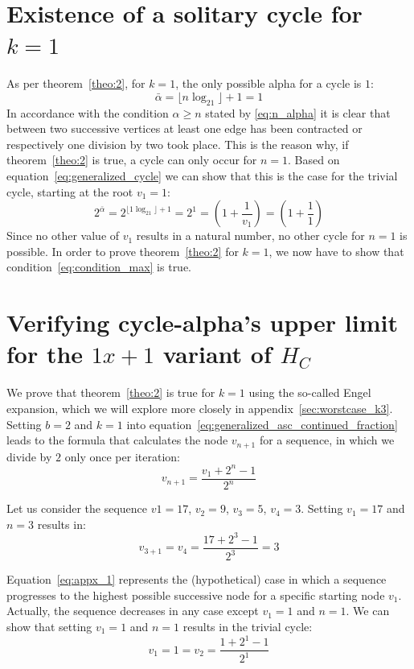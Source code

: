 \section{Existence of a solitary cycle for $k=1$}
As per theorem~\ref{theo:2}, for $k=1$, the only possible alpha for a cycle is $1$:
\[
\bar\alpha=\lfloor n\log_21\rfloor+1=1
\]
In accordance with the condition $\alpha\ge n$ stated by \ref{eq:n_alpha} it is clear that between two successive vertices at least one edge has been contracted or respectively one division by two took place. This is the reason why, if theorem~\ref{theo:2} is true, a cycle can only occur for $n=1$. Based on equation~\ref{eq:generalized_cycle} we can show that this is the case for the trivial cycle, starting at the root $v_1=1$:
\[
2^{\bar\alpha}=2^{\lfloor 1\log_21\rfloor+1}=2^1=\left(1+\frac{1}{v_1}\right)=\left(1+\frac{1}{1}\right)
\]
Since no other value of $v_1$ results in a natural number, no other cycle for $n=1$ is possible. In order to prove theorem~\ref{theo:2} for $k=1$, we now have to show that condition~\ref{eq:condition_max} is true.

\section{Verifying cycle-alpha's upper limit for the $1x+1$ variant of $H_C$}
\label{sec:alphas_upper_limit_k_1}
We prove that theorem~\ref{theo:2} is true for $k=1$ using the so-called Engel expansion, which we will explore more closely in appendix~\ref{sec:worstcase_k3}. Setting $b=2$ and $k=1$ into equation~\ref{eq:generalized_asc_continued_fraction} leads to the formula that calculates the node $v_{n+1}$ for a sequence, in which we divide by $2$ only once per iteration:
\begin{equation}
\label{eq:appx_1}
v_{n+1}=\frac{v_1+2^n-1}{2^n}
\end{equation}

\begin{example}
	Let us consider the sequence $v1=17$, $v_2=9$, $v_3=5$, $v_4=3$. Setting $v_1=17$ and $n=3$ results in:
	\[
	v_{3+1}=v_4=\frac{17+2^3-1}{2^3}=3
	\]
\end{example}

Equation~\ref{eq:appx_1} represents the (hypothetical) case in which a sequence progresses to the highest possible successive node for a specific starting node $v_1$. Actually, the sequence decreases in any case except $v_1=1$ and $n=1$. We can show that setting $v_1=1$ and $n=1$ results in the trivial cycle:
\[
v_1=1=v_2=\frac{1+2^1-1}{2^1}
\]

